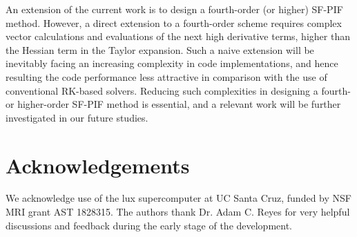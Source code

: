 \documentclass[times,preprint,3p]{elsarticle}
\begin{document}
An extension of the current work %
is to design a fourth-order (or higher)
SF-PIF method. However, a direct extension
to a fourth-order scheme requires complex
vector calculations and evaluations of the next high derivative terms,
higher than the Hessian term in the Taylor expansion.
Such a naive extension will be inevitably facing an increasing complexity
in code implementations, and hence resulting the code performance less attractive
in comparison with the use of conventional RK-based solvers.
Reducing such complexities in designing a fourth- or higher-order
SF-PIF method is essential, and a relevant work
will be further investigated in our future studies.



\section{Acknowledgements}
We acknowledge use of the lux supercomputer at
UC Santa Cruz, funded by NSF MRI grant AST 1828315.
The authors thank Dr. Adam C. Reyes
for very helpful discussions and feedback
during the early stage of the development.




% 
\label{sec:references}
% 
\end{document}
